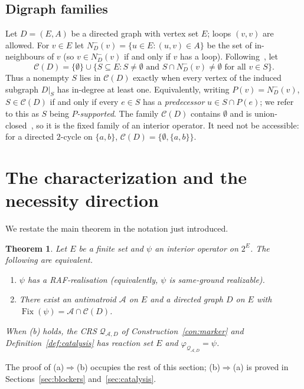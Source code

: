 \documentclass[11pt,a4paper]{article}
\theoremstyle{plain}
\newtheorem{theorem}{Theorem}[section]
\theoremstyle{definition}
\theoremstyle{remark}
\newcommand{\Fix}{\operatorname{Fix}}
\newcommand{\cA}{\mathcal{A}}
\newcommand{\cC}{\mathcal{C}}
\newcommand{\cQ}{\mathcal{Q}}
\newcommand{\pw}[1]{2^{#1}}
\newcommand{\Nin}{N^{-}}
\begin{document}
\subsection{Digraph families}

Let $D=(E,A)$ be a directed graph with vertex set $E$; loops $(v,v)$ are allowed. For $v\in E$ let $\Nin_D(v)=\{u\in E:(u,v)\in A\}$ be the set of in-neighbours of $v$ (so $v\in\Nin_D(v)$ if and only if $v$ has a loop). Following~\cite[Section~2.1]{steel2023interior}, let
\[
\cC(D)=\{\emptyset\}\cup\{S\subseteq E: S\neq\emptyset\text{ and }S\cap\Nin_D(v)\neq\emptyset\text{ for all }v\in S\}.
\]
Thus a nonempty $S$ lies in $\cC(D)$ exactly when every vertex of the induced subgraph $D|_S$ has in-degree at least one. Equivalently, writing $P(v)=\Nin_D(v)$, $S\in\cC(D)$ if and only if every $e\in S$ has a \emph{predecessor} $u\in S\cap P(e)$; we refer to this as $S$ being \emph{$P$-supported}. The family $\cC(D)$ contains $\emptyset$ and is union-closed~\cite[Proposition~2(i)]{steel2023interior}, so it is the fixed family of an interior operator. It need not be accessible: for a directed $2$-cycle on $\{a,b\}$, $\cC(D)=\{\emptyset,\{a,b\}\}$.

\section{The characterization and the necessity direction}\label{sec:necessity}

We restate the main theorem in the notation just introduced.

\begin{theorem}\label{thm:main}
Let $E$ be a finite set and $\psi$ an interior operator on $\pw{E}$. The following are equivalent.
\begin{enumerate}[label=(\alph*)]
\item $\psi$ has a RAF-realisation (equivalently, $\psi$ is same-ground realizable).
\item There exist an antimatroid $\cA$ on $E$ and a directed graph $D$ on $E$ with $\Fix(\psi)=\cA\cap\cC(D)$.
\end{enumerate}
When (b) holds, the CRS $\cQ_{\cA,D}$ of Construction~\ref{con:marker} and Definition~\ref{def:catalysis} has reaction set $E$ and $\varphi_{\cQ_{\cA,D}}=\psi$.
\end{theorem}

The proof of (a)$\Rightarrow$(b) occupies the rest of this section; (b)$\Rightarrow$(a) is proved in Sections~\ref{sec:blockers} and~\ref{sec:catalysis}.
\end{document}
